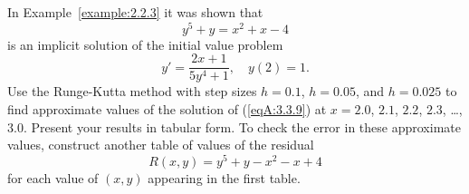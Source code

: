 \documentclass{ximera}
\begin{document}
\begin{problem}\label{exer:3.3.9}
In Example~\ref{example:2.2.3} it was shown that
$$
y^5+y=x^2+x-4
$$
is an implicit solution of  the initial value problem
\begin{equation}\label{eqA:3.3.9}
y'=\frac{2x+1}{5y^4+1},\quad y(2)=1.
\end{equation}
Use the Runge-Kutta method with step sizes $h=0.1$, $h=0.05$, and
$h=0.025$ to find approximate values of the solution of (\ref{eqA:3.3.9}) at
$x=2.0$, $2.1$, $2.2$, $2.3$, \dots, $3.0$. Present your results in tabular form.
To check the error in these approximate values, construct another
table of values of the residual
$$
  R(x,y)=y^5+y-x^2-x+4
$$
for each value of $(x,y)$ appearing in the first table.
\end{problem}
\end{document}
